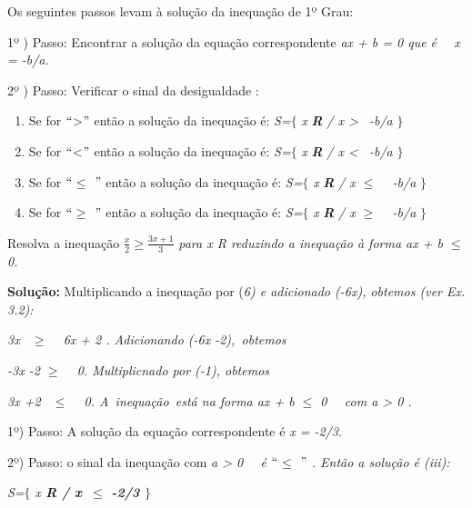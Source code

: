 \begin{caixa}

Os seguintes passos levam à solução da inequação de 1º Grau: 

1º ) Passo: Encontrar a solução da equação correspondente \textit{ax + b = 0 que é~~ x = -b/a.}

2º ) Passo: Verificar o sinal da desigualdade :

\begin{enumerate}
	\item Se for $``$>$"$  então a solução da inequação é:  \textit{S=}$ \{ $ \textit{x } \textbf{\textit{R}} \textit{/ x >~ -b/a} $ \} $ 

	\item Se for $``$<$"$  então a solução da inequação é:  \textit{S=}$ \{ $ \textit{x } \textbf{\textit{R}} \textit{/ x <~ -b/a} $ \} $ 

	\item Se for \textit{$``$$ \leq $ $"$ } então a solução da inequação é:  \textit{S=}$ \{ $ \textit{x } \textbf{\textit{R}} \textit{/ x $ \leq $ ~ -b/a} $ \} $ 

	\item Se for \textit{$``$$ \geq $ $"$ } então a solução da inequação é:  \textit{S=}$ \{ $ \textit{x } \textbf{\textit{R}} \textit{/ x $ \geq $ ~ -b/a} $ \} $ 
\end{enumerate}
\end{caixa}

\begin{texemplo}
    Resolva a inequação \( \frac{x}{2} \geq \frac{3x+1}{3} \) \textit{ para x  R reduzindo a inequação à forma ax + b $ \leq $   0.}

\textbf{Solução:} Multiplicando a inequação por (\textit{6) e adicionado (-6x), obtemos (ver Ex. 3.2):}

\textit{3x~ $ \geq $ ~ 6x + 2 . Adicionando (-6x -2),~obtemos  }

\textit{-3x -2  $ \geq $ ~ 0. Multiplicnado por (-1), obtemos~~~  }

\textit{3x +2~ $ \leq $ ~ 0. A~inequação~está na forma   ax + b $ \leq $   0~~ com a > 0 .}

1º) Passo: A solução da equação correspondente é \textit{x = -2/3.}

2º) Passo: o sinal da inequação com \textit{a > 0~~ é $``$$ \leq $ $"$ . Então a solução é (iii):}

\textit{S=$ \{ $ x  \textbf{R / x~$ \leq $   -2/3 $ \} $  \qedsymbol{}}}
\end{texemplo}

